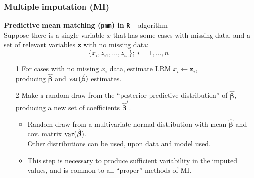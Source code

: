 \documentclass{beamer}
\begin{document}
\begin{frame}
\frametitle{Multiple imputation (MI)}
\textbf{Predictive mean matching (\texttt{pmm}) in \texttt{R}} -- algorithm\\
\medskip
Suppose there is a single variable $x$ that has some cases with missing data, and a set of relevant variables $\bm{z}$ with no missing data:
$$
\{ x_i, z_{i1}, \dots, z_{iL}\};~i = 1, \dots , n
$$
\vspace{-0.5cm}
\begin{enumerate}
    \item[1] For cases with no missing $x_i$ data, estimate LRM $x_i \leftarrow \bm{z}_i$, \\producing $\hat{\bm{\beta}}$ and $\textnormal{var}(\hat{\bm{\beta}})$ estimates.
    \medskip
    \item[2] Make a random draw from the ``posterior predictive distribution'' of $\hat{\bm{\beta}}$, producing a new set of coefficients $\hat{\bm{\beta}}^{\ast}$.\\
    \medskip
    \begin{itemize}
        \item Random draw from a multivariate normal distribution with mean $\hat{\bm{\beta}}$ and cov. matrix $\textnormal{var}(\hat{\bm{\beta}})$. \\ \smallskip Other distributions can be used, upon data and model used.
    \medskip 
    \item This step is necessary to produce sufficient variability in the imputed values, and is common to all ``proper'' methods of MI.
    \end{itemize}
\end{enumerate}
\end{frame}
\end{document}
